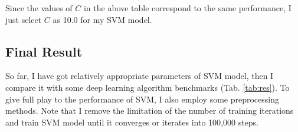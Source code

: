\documentclass[12pt,a4paper]{article}
\theoremstyle{definition}
\begin{document}
\vspace{-0.005\linewidth}
Since the values of $C$ in the above table correspond to the same performance, I just select $C$ as 10.0 for my SVM model.

\vspace{-0.015\linewidth}
\subsection{Final Result}
\label{sec:final_res}

\vspace{-0.01\linewidth}
So far, I have got relatively appropriate parameters of SVM model, then I compare it with some deep learning algorithm benchmarks \cite{bench} (Tab. \ref{tab:res}). To give full play to the performance of SVM, I also employ some preprocessing methods. Note that I remove the limitation of the number of training iterations and train SVM model until it converges or iterates into 100,000 steps.
\end{document}
